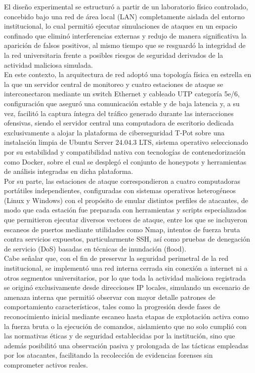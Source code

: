 El diseño experimental se estructuró a partir de un laboratorio físico controlado, concebido bajo una red de área local (LAN) completamente aislada del entorno institucional, lo cual permitió ejecutar simulaciones de ataques en un espacio confinado que eliminó interferencias externas y redujo de manera significativa la aparición de falsos positivos, al mismo tiempo que se resguardó la integridad de la red universitaria frente a posibles riesgos de seguridad derivados de la actividad maliciosa simulada.\\
En este contexto, la arquitectura de red adoptó una topología física en estrella en la que un servidor central de monitoreo y cuatro estaciones de ataque se interconectaron mediante un switch Ethernet y cableado UTP categoría 5e/6, configuración que aseguró una comunicación estable y de baja latencia y, a su vez, facilitó la captura íntegra del tráfico generado durante las interacciones ofensivas, siendo el servidor central una computadora de escritorio dedicada exclusivamente a alojar la plataforma de ciberseguridad T-Pot sobre una instalación limpia de Ubuntu Server 24.04.3 LTS, sistema operativo seleccionado por su estabilidad y compatibilidad nativa con tecnologías de contenedorización como Docker, sobre el cual se desplegó el conjunto de honeypots y herramientas de análisis integradas en dicha plataforma.\\
Por su parte, las estaciones de ataque correspondieron a cuatro computadoras portátiles independientes, configuradas con sistemas operativos heterogéneos (Linux y Windows) con el propósito de emular distintos perfiles de atacantes, de modo que cada estación fue preparada con herramientas y scripts especializados que permitieron ejecutar diversos vectores de ataque, entre los que se incluyeron escaneos de puertos mediante utilidades como Nmap, intentos de fuerza bruta contra servicios expuestos, particularmente SSH, así como pruebas de denegación de servicio (DoS) basadas en técnicas de inundación (flood).\\
Cabe señalar que, con el fin de preservar la seguridad perimetral de la red institucional, se implementó una red interna cerrada sin conexión a internet ni a otros segmentos universitarios, por lo que toda la actividad maliciosa registrada se originó exclusivamente desde direcciones IP locales, simulando un escenario de amenaza interna que permitió observar con mayor detalle patrones de comportamiento característicos, tales como la progresión desde fases de reconocimiento inicial mediante escaneo hasta etapas de explotación activa como la fuerza bruta o la ejecución de comandos, aislamiento que no solo cumplió con las normativas éticas y de seguridad establecidas por la institución, sino que además posibilitó una observación pasiva y prolongada de las tácticas empleadas por los atacantes, facilitando la recolección de evidencias forenses sin comprometer activos reales.\\
